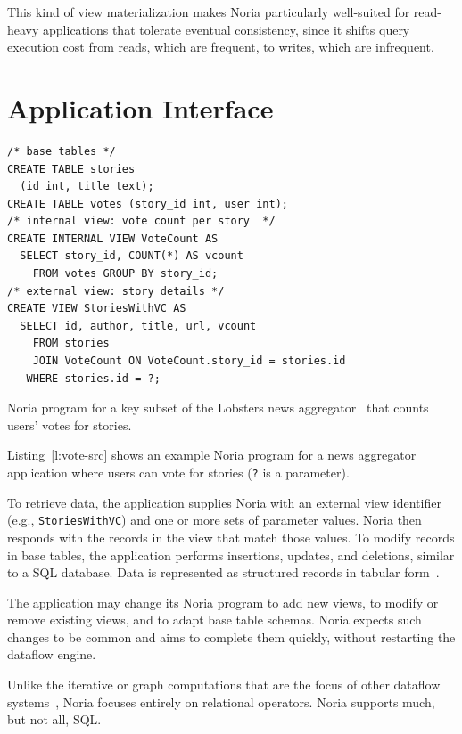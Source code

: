 This kind of view materialization makes Noria particularly well-suited for
read-heavy applications that tolerate eventual consistency, since it shifts
query execution cost from reads, which are frequent, to writes, which are
infrequent.

\section{Application Interface}

\begin{listing}[h]
  \begin{verbatim}
/* base tables */
CREATE TABLE stories
  (id int, title text);
CREATE TABLE votes (story_id int, user int);
/* internal view: vote count per story  */
CREATE INTERNAL VIEW VoteCount AS
  SELECT story_id, COUNT(*) AS vcount
    FROM votes GROUP BY story_id;
/* external view: story details */
CREATE VIEW StoriesWithVC AS
  SELECT id, author, title, url, vcount
    FROM stories
    JOIN VoteCount ON VoteCount.story_id = stories.id
   WHERE stories.id = ?;
  \end{verbatim}
  \caption{Noria program for a key subset of the Lobsters news
           aggregator~\cite{lobsters} that counts users' votes for stories.}
  \label{l:vote-src}
\end{listing}

Listing~\vref{l:vote-src} shows an example Noria program for a news aggregator
application where users can vote for stories (\texttt{?} is a parameter).

To retrieve data, the application supplies Noria with an external view
identifier (e.g., \texttt{StoriesWithVC}) and one or more sets of parameter
values. Noria then responds with the records in the view that match those
values. To modify records in base tables, the application performs insertions,
updates, and deletions, similar to a SQL database. Data is represented as
structured records in tabular form~\cite{spanner, bigtable}.

The application may change its Noria program to add new views, to modify or
remove existing views, and to adapt base table schemas. Noria expects such
changes to be common and aims to complete them quickly, without restarting the
dataflow engine.

Unlike the iterative or graph computations that are the focus of other dataflow
systems~\cite{naiad, differential-dataflow}, Noria focuses entirely on
relational operators. Noria supports much, but not all, SQL.

